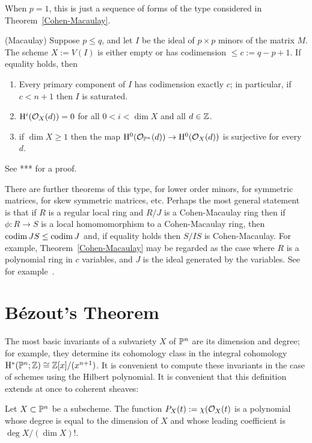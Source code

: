 When $p=1$, this is just a sequence of forms of the type considered
in Theorem~\ref{Cohen-Macaulay}. 

\begin{theorem} (Macaulay)\label{determinantal Cohen-Macaulay}
Suppose $p\leq q$, and let $I$ be the ideal of $p\times p$ minors of the matrix $M$.
The scheme $X:= V(I)$ is either empty or has codimension $\leq c:= q-p+1$. If equality holds,  then 
\begin{enumerate}
 \item Every primary component of $I$ has codimension exactly $c$; in particular, if $c<n+1$ then $I$ is saturated.
 \item $\HH^{i}(\cO_{X}(d)) = 0$ for all $0<i<\dim X$ and all $d\in \ZZ$.
 \item if $\dim X\geq 1$
then the map
$\HH^{0}(\cO_{\PP^{n}}(d)) \to \HH^{0}(\cO_{X}(d))$ is surjective for every $d$.
\end{enumerate}
\end{theorem}

See *** for a proof.

\begin{fact}
There are further theorems of this type, for lower order minors, for symmetric matrices, for skew symmetric matrices, etc. Perhaps the most general
statement is that if $R$ is a regular local ring and $R/J$ is a Cohen-Macaulay ring then if $\phi:R\to S$ is a local homomomorphism to a Cohen-Macaulay ring, then $\codim JS\leq \codim J$ and, if equality holds then
$S/IS$ is Cohen-Macaulay. For example, Theorem~\ref{Cohen-Macaulay} may be regarded as the case where
$R$ is a polynomial ring in $c$ variables, and $J$ is the ideal generated by the variables. See for example~\cite{Jee Koh, Super Height paper}.
\end{fact}

\section{B\'ezout's Theorem}

The most basic invariants of a subvariety $X$ of $\PP^{n}$ are its dimension and degree; for example, they determine its cohomology class in the integral cohomology $\HH^{*}(\PP^{n}; \ZZ) \cong \ZZ[x]/(x^{n+1})$.  It is convenient to compute these invariants in the case of schemes using the Hilbert polynomial. It is convenient that this definition extends at once to coherent sheaves:

\begin{theorem}
 Let $X\subset \PP^{n}$ be a subscheme. The function
 $P_{X}(t): = \chi(\cO_{X}(t)$
 is a polynomial whose degree is equal to the dimension of $X$ and whose leading coefficient
is $\deg X/(\dim X)!$. 
\end{theorem}

